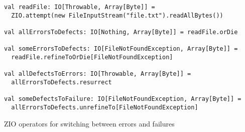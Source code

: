 \begin{algorithm}

\begin{verbatim}
val readFile: IO[Throwable, Array[Byte]] =
  ZIO.attempt(new FileInputStream("file.txt").readAllBytes())

val allErrorsToDefects: IO[Nothing, Array[Byte]] = readFile.orDie

val someErrorsToDefects: IO[FileNotFoundException, Array[Byte]] =
  readFile.refineToOrDie[FileNotFoundException]

val allDefectsToErrors: IO[Throwable, Array[Byte]] =
  allErrorsToDefects.resurrect

val someDefectsToFailure: IO[FileNotFoundException, Array[Byte]] =
  allErrorsToDefects.unrefineTo[FileNotFoundException]
\end{verbatim}

\caption{ZIO operators for switching between errors and failures \label{zio:defect-handling}}
\end{algorithm}